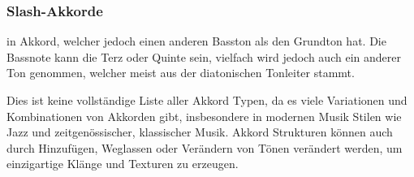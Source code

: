 \subsubsection*{Slash-Akkorde} 
in Akkord, welcher jedoch einen anderen Basston als den Grundton hat. Die Bassnote kann die Terz oder Quinte sein, vielfach wird jedoch auch ein anderer Ton genommen, welcher meist aus der diatonischen Tonleiter stammt. 

Dies ist keine vollständige Liste aller Akkord Typen, da es viele Variationen und Kombinationen von Akkorden gibt, insbesondere in modernen Musik Stilen wie Jazz und zeitgenössischer, klassischer Musik. Akkord Strukturen können auch durch Hinzufügen, Weglassen oder Verändern von Tönen verändert werden, um einzigartige Klänge und Texturen zu erzeugen.